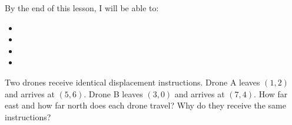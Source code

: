\documentclass[10pt]{article}
\begin{document}
\namedateperiod

\vspace{0.1in}

\begin{objectivebox}
By the end of this lesson, I will be able to:
\begin{itemize}[leftmargin=1.5em, itemsep=3pt]
  \item \writeline
  \item \writeline
  \item \writeline
  \item \writeline
\end{itemize}
\end{objectivebox}

\vspace{0.08in}

\begin{vocabbox}
\end{vocabbox}

\vspace{0.08in}

\begin{hookbox}
Two drones receive identical displacement instructions. Drone A leaves $(1,2)$ and
arrives at $(5,6)$. Drone B leaves $(3,0)$ and arrives at $(7,4)$.
How far east and how far north does each drone travel? Why do they receive the same instructions?

\writeline
\end{hookbox}

\vspace{0.08in}
\end{document}
